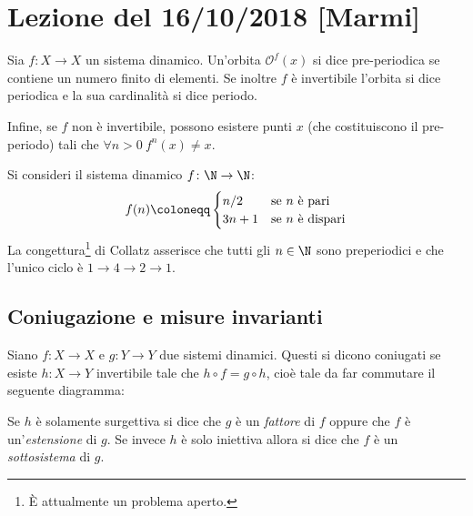 \section{Lezione del 16/10/2018 [Marmi]}
\begin{definition} Sia $f\colon X \to X$ un sistema dinamico. Un'orbita $\mathcal{O}^f(x)$ si dice pre-periodica se contiene un numero finito di elementi. Se inoltre $ f $ è invertibile l'orbita si dice periodica e la sua cardinalità si dice periodo.

Infine, se $f$ non è invertibile, possono esistere punti $ x $ (che costituiscono il pre-periodo) tali che $ \forall n > 0\ f^n (x) \neq x $.
\end{definition}

\begin{example}
Si consideri il sistema dinamico $f \colon \N \to \N$:
\[
    f(n) \coloneqq
    \begin{cases}
        n/2 & \text{se $ n $ è pari}\\
        3n+1 & \text{se $ n $ è dispari} \\
    \end{cases}
\]
La congettura\footnote{È attualmente un problema aperto.} di Collatz asserisce che tutti gli $n \in \N$ sono preperiodici e che l'unico ciclo è $ 1 \to 4 \to 2 \to 1 $.
\end{example}

\subsection{Coniugazione e misure invarianti}
\begin{definition}
Siano $f\colon X \to X$ e $g\colon Y \to Y$ due sistemi dinamici. Questi si dicono coniugati se esiste $h \colon X \to Y$ invertibile tale che $h \circ f = g \circ h$, cioè tale da far commutare il seguente diagramma:
\begin{center}
\end{center}
Se $h$ è solamente surgettiva si dice che $g$ è un \emph{fattore} di $f$ oppure che $f$ è un'\emph{estensione} di $g$. Se invece $h$ è solo iniettiva allora si dice che $f$ è un \emph{sottosistema} di $g$.
\end{definition}


